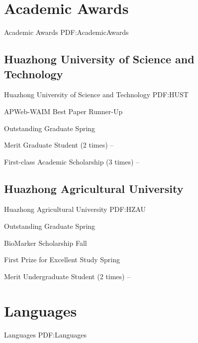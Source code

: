 \documentclass[letterpaper,10pt,oneside]{article}
\begin{document}
\begin{body}
\section
{Academic Awards}
{Academic Awards}
{PDF:AcademicAwards}

\subsection
{Huazhong University of Science and Technology}
{Huazhong University of Science and Technology}
{PDF:HUST}
\GapNoBreak

\BulletItem
APWeb-WAIM Best Paper Runner-Up
\hfill
{}

\GapNoBreak

\BulletItem
Outstanding Graduate
\hfill
Spring 

\GapNoBreak

\BulletItem
Merit Graduate Student (2 times)
\hfill
{} --

\GapNoBreak
\BulletItem
First-class Academic Scholarship (3 times)
\hfill
{} --
\BigGap
\GapNoBreak
\subsection
{Huazhong Agricultural University}
{Huazhong Agricultural University}
{PDF:HZAU}

\BulletItem
Outstanding Graduate
\hfill
Spring 

\GapNoBreak
\BulletItem
BioMarker Scholarship 
\hfill
Fall 

\GapNoBreak
\BulletItem
First Prize for Excellent Study 
\hfill
Spring 

\GapNoBreak
\BulletItem
Merit Undergraduate Student (2 times)
\hfill
{} --





\iffalse
\section
{Languages}
{Languages}
{PDF:Languages}


\end{body}
\end{document}
